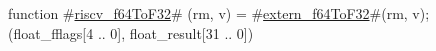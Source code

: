 function #\hyperref[sailRISCVzriscvzyf64ToF32]{riscv\_f64ToF32}# (rm, v) = {
  #\hyperref[sailRISCVzexternzyf64ToF32]{extern\_f64ToF32}#(rm, v);
  (float_fflags[4 .. 0], float_result[31 .. 0])
}
